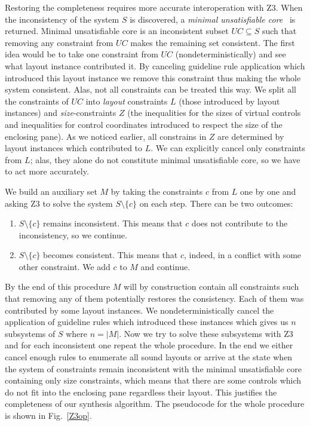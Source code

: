 Restoring the completeness requires more accurate interoperation with \textsc{Z3}.
When the inconsistency of the system $S$ is discovered, a \emph{minimal unsatisfiable core}~\cite{minUnsatCore} is returned.
Minimal unsatisfiable core is an inconsistent subset $UC\subseteq S$ such that removing any constraint from $UC$ makes the remaining set consistent.
The first idea would be to take one constraint from $UC$ (nondeterministically) and see what layout instance contributed it.
By canceling guideline rule application which introduced this
layout instance we remove this constraint thus making the whole system consistent.
Alas, not all constraints can be treated this way.
We split all the constraints of $UC$ into \emph{layout} constraints $L$ (those
introduced by layout instances) and \emph{size}-constraints $Z$ (the inequalities for the sizes of virtual controls and
inequalities for control coordinates introduced to respect the size of the enclosing pane).
As we noticed earlier,
all constrains in $Z$ are determined by layout instances which contributed to $L$.
We can explicitly cancel only constraints from $L$; alas, they alone do not constitute minimal unsatisfiable core, so we have to act more accurately.

We build an auxiliary set $M$ by taking the constraints $c$ from $L$ one by one and asking \textsc{Z3} to solve the system $S\setminus\{c\}$ on each step.
There can be two outcomes:

\begin{enumerate}
\item $S\setminus\{c\}$ remains inconsistent. This means that $c$ does not contribute to the inconsistency, so
  we continue.
\item $S\setminus\{c\}$ becomes consistent. This means that $c$, indeed, in a conflict with some other
  constraint. We add $c$ to $M$ and continue.
\end{enumerate}

By the end of this procedure $M$ will by construction contain all constraints such that removing any of them potentially
restores the consistency. Each of them was contributed by some layout instances. We nondeterministically
cancel the application of guideline rules which introduced these instances which gives us $n$ subsystems of $S$ where $n=|M|$.
Now we try to solve these subsystems with \textsc{Z3} and for each inconsistent one repeat the whole procedure. In the
end we either cancel enough rules to enumerate all sound layouts or arrive at the state when the system of
constraints remain inconsistent with the minimal unsatisfiable core containing only size constraints, which means that
there are some controls which do not fit into the enclosing pane regardless their layout. This justifies the completeness
of our synthesis algorithm. The pseudocode for the whole procedure is shown in Fig.~\ref{Z3op}.

